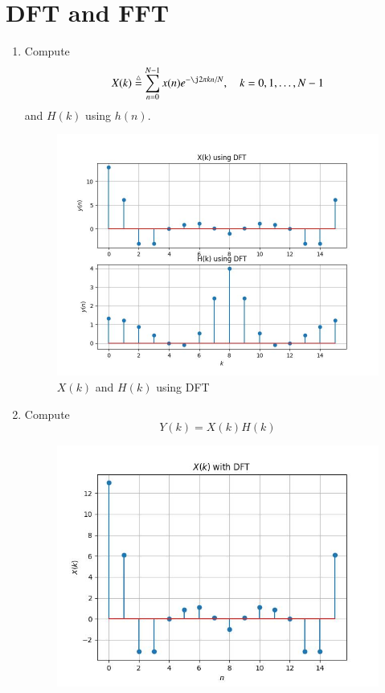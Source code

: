 \documentclass[journal,12pt,twocolumn]{IEEEtran}
\renewcommand\thesection{\arabic{section}}
\begin{document}
\section{DFT and FFT}
\begin{enumerate}[label=\thesection.\arabic*]
	\item
	Compute
	\begin{equation}
		X(k) \define \sum _{n=0}^{N-1}x(n) e^{-\j2\pi kn/N}, \quad k = 0,1,\dots, N-1
	\end{equation}
	and $H(k)$ using $h(n)$.\\
\newline	\solution
	\begin{figure}[!ht]
		\centering
		\includegraphics[width=\columnwidth]{./figs/e6.1DFT.jpg}
		\caption{$X(k)$ and $H(k)$ using DFT}
		\label{fig:Xkdft}
	\end{figure}
	\item Compute 
	\begin{equation}
		Y(k) = X(k)H(k)
	\end{equation}
	\solution
	\begin{figure}[!ht]
		\centering
		\includegraphics[width=\columnwidth]{./figs/XkDFT.jpg}

\end{figure}
\end{enumerate}
\end{document}

